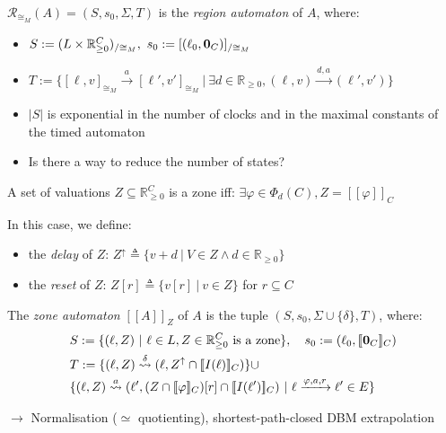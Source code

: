 \documentclass{beamer}
\theoremstyle{definition}
\newcommand{\xra}[1]{\overset{#1}{\rightsquigarrow}}
\begin{document}
\begin{frame}
\begin{definition}
  $\mathcal{R}_{\cong_M}(A) = (S, s_0, \Sigma, T)$ is the \emph{region automaton} of $A$, where:
  \begin{itemize}
    \item $S := (L \times \mathbb{R}_{\geq 0}^C)_{/\cong_M},\ s_0 := [(\ell_0, \text{\bf 0}_C)]_{/\cong_M}$
    \item $T := \{[\ell, v]_{\cong_M} \xrightarrow{a} [\ell', v']_{\cong_M}\ |\ \exists d \in \mathbb{R}_{\geq 0}, (\ell, v) \xrightarrow{d, a} (\ell', v')\}$
  \end{itemize}
\end{definition}
\begin{itemize}
  \item<2> $\left| S \right|$ is exponential in the number of clocks and in the maximal constants of the timed automaton
  \item<2> Is there a way to reduce the number of states?
\end{itemize}
\end{frame}

\begin{frame}
  \small
  \begin{definition}[Zone]
    A set of valuations $Z \subseteq \mathbb{R}_{\geq 0}^C$ is a zone iff:
    $\exists \varphi \in \varPhi_d(C), Z = [\![\varphi]\!]_C$
    
    In this case, we define:
    \begin{itemize}
      \item the \emph{delay} of $Z$: $Z^\uparrow \triangleq \{ v + d \ |\ V \in Z \land d \in \mathbb{R}_{\geq 0}\}$
      \item the \emph{reset} of $Z$: $Z[r] \triangleq \{ v[r] \ |\ v \in Z\}$ for $r \subseteq C$
    \end{itemize}
  \end{definition}
  \small
  \begin{definition}
    The \emph{zone automaton} $[\![A]\!]_Z$ of $A$ is the tuple $(S, s_0, \Sigma \cup \{\delta\}, T)$, where:
    \begin{align*}
      &S := \{ (\ell, Z)\ |\ \ell \in L, Z \in \mathbb{R}_{\geq 0}^C\ \text{is a zone}\},\quad s_0 := (\ell_0, [\![\text{\bf 0}_C]\!]_C)\\
      &T := \{ (\ell, Z) \xra{\delta} (\ell, Z^\uparrow \cap [\![I(\ell)]\!]_C)\} \cup \\
      &\{ (\ell, Z) \xra{a} (\ell', (Z \cap [\![\varphi]\!]_C)[r] \cap [\![I(\ell')]\!]_C) \ |\ \ell \xrightarrow{\varphi, a, r} \ell' \in E\}
    \end{align*}
  \end{definition}
  $\rightarrow$ Normalisation ($\simeq$ quotienting), shortest-path-closed DBM extrapolation
\end{frame}
\end{document}
